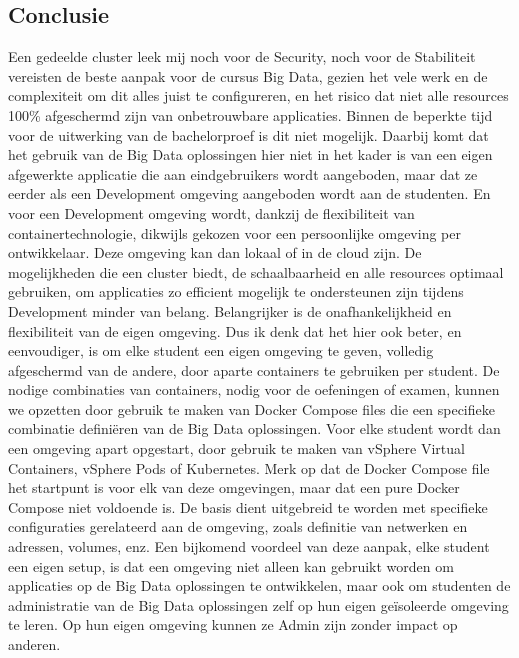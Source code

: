 \subsection{Conclusie}

Een gedeelde cluster leek mij noch voor de Security, noch voor de Stabiliteit vereisten de beste aanpak voor de cursus Big Data, gezien het vele werk en de complexiteit om dit alles juist te configureren, en het risico dat niet alle resources 100\% afgeschermd zijn van onbetrouwbare applicaties. Binnen de beperkte tijd voor de uitwerking van de bachelorproef is dit niet mogelijk.
\newline
\newline
Daarbij komt dat het gebruik van de Big Data oplossingen hier niet in het kader is van een eigen afgewerkte applicatie die aan eindgebruikers wordt aangeboden, maar dat ze eerder als een Development omgeving aangeboden wordt aan de studenten. En voor een Development omgeving wordt, dankzij de flexibiliteit van containertechnologie, dikwijls gekozen voor een persoonlijke omgeving per ontwikkelaar. Deze omgeving kan dan lokaal of in de cloud zijn.
\newline
\newline
De mogelijkheden die een cluster biedt, de schaalbaarheid en alle resources optimaal gebruiken, om applicaties zo efficient mogelijk te ondersteunen zijn tijdens Development minder van belang. Belangrijker is de onafhankelijkheid en flexibiliteit van de eigen omgeving.
Dus ik denk dat het hier ook beter, en eenvoudiger, is om elke student een eigen omgeving te geven, volledig afgeschermd van de andere, door aparte containers te gebruiken per student.
\newline
\newline
De nodige combinaties van containers, nodig voor de oefeningen of examen, kunnen we opzetten door gebruik te maken van Docker Compose files die een specifieke combinatie definiëren van de Big Data oplossingen. Voor elke student wordt dan een omgeving apart opgestart, door gebruik te maken van vSphere Virtual Containers, vSphere Pods of Kubernetes. Merk op dat de Docker Compose file het startpunt is voor elk van deze omgevingen, maar dat een pure Docker Compose niet voldoende is. De basis dient uitgebreid te worden met specifieke configuraties gerelateerd aan de omgeving, zoals definitie van netwerken en adressen, volumes, enz.
\newline
\newline
Een bijkomend voordeel van deze aanpak, elke student een eigen setup, is dat een omgeving niet alleen kan gebruikt worden om applicaties op de Big Data oplossingen te ontwikkelen, maar ook om studenten de administratie van de Big Data oplossingen zelf op hun eigen geïsoleerde omgeving te leren. Op hun eigen omgeving kunnen ze Admin zijn zonder impact op anderen.

